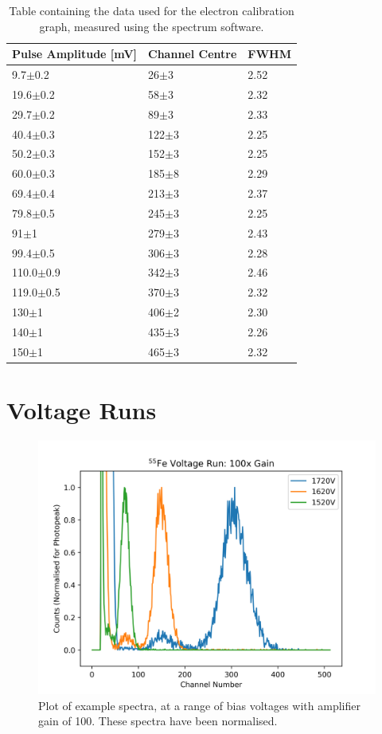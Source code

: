 \documentclass[a4paper, twoside, 11pt]{report}
\begin{document}
\begin{table} \centering
  \begin{tabular}{lll}
    \hline
    \hline
    Pulse Amplitude [mV]     & Channel Centre       & FWHM \\ \hline
    9.7$\pm$0.2   & 26$\pm$3  & 2.52 \\
    19.6$\pm$0.2  & 58$\pm$3  & 2.32 \\
    29.7$\pm$0.2  & 89$\pm$3  & 2.33 \\
    40.4$\pm$0.3  & 122$\pm$3 & 2.25 \\
    50.2$\pm$0.3  & 152$\pm$3 & 2.25 \\
    60.0$\pm$0.3  & 185$\pm$8 & 2.29 \\
    69.4$\pm$0.4  & 213$\pm$3 & 2.37 \\
    79.8$\pm$0.5  & 245$\pm$3 & 2.25 \\
    91$\pm$1      & 279$\pm$3 & 2.43 \\
    99.4$\pm$0.5  & 306$\pm$3 & 2.28 \\
    110.0$\pm$0.9 & 342$\pm$3 & 2.46 \\
    119.0$\pm$0.5 & 370$\pm$3 & 2.32 \\
    130$\pm$1     & 406$\pm$2 & 2.30 \\
    140$\pm$1     & 435$\pm$3 & 2.26 \\
    150$\pm$1     & 465$\pm$3 & 2.32 \\ \hline \hline
  \end{tabular}
  \caption{Table containing the data used for the electron calibration graph, measured using the spectrum software.}
  \label{tbl:electronCalibrationData}
\end{table}

\chapter{Voltage Runs}

\begin{figure}[h]
  \centering
  \includegraphics[width=\linewidth]{voltageRunData.png}
  \caption{Plot of example spectra, at a range of bias voltages with amplifier gain of 100. These spectra have been normalised.}
  \label{fig:voltageRunData}
\end{figure}
\end{document}

